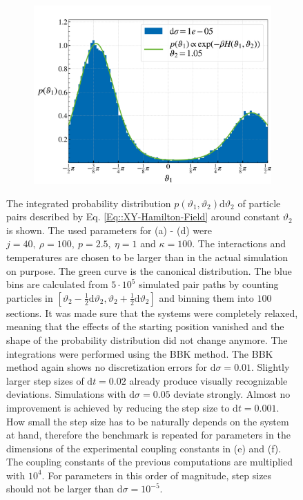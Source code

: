 \begin{figure}[htp]
\begin{subfigure}{0.5\textwidth}
		\end{subfigure}
		\begin{subfigure}{0.5\textwidth}
			\centering
			\includegraphics[width=0.8\linewidth]{graphics/eq-dist-0.00001.png}
		\end{subfigure} 
		\caption{The integrated probability distribution $p(\vartheta_1, \vartheta_2)\text{d}\vartheta_2$ of particle pairs described by Eq. \eqref{Eq::XY-Hamilton-Field} around constant $\vartheta_2$ is shown. The used parameters for (a) - (d) were $j =	40,~ \rho =	100,~ p=2.5,~ \eta =	1$ and $\kappa = 100$. The interactions and temperatures are chosen to be larger than in the actual simulation on purpose. The green curve is the canonical distribution. The blue bins are calculated from $5 \cdot 10^5$ simulated pair paths by counting particles in $\left[\vartheta_2 - \tfrac{1}{2} \text{d} \vartheta_2, \vartheta_2 + \tfrac{1}{2} \text{d} \vartheta_2 \right]$ and binning them into $100$ sections. It was made sure that the systems were completely relaxed, meaning that the effects of the starting position vanished and the shape of the probability distribution did not change anymore. The integrations were performed using the BBK method. The BBK method again shows no discretization errors for $\text{d}\sigma=0.01$. Slightly larger step sizes of $\text{d}t =	0.02$ already produce visually recognizable deviations. Simulations with $\text{d}\sigma = 0.05 $ deviate strongly. Almost no improvement is achieved by reducing the step size to $\text{d}t =	0.001$. How small the step size has to be naturally depends on the system at hand, therefore the benchmark is repeated for parameters in the dimensions of the experimental coupling constants in (e) and (f). The coupling constants of the previous computations are multiplied with $10^4$. For parameters in this order of magnitude, step sizes should not be larger than $\text{d}\sigma = 10^{-5}$.}
		\label{Fig::Pair-Prob-Dist}
	\end{figure}
	
